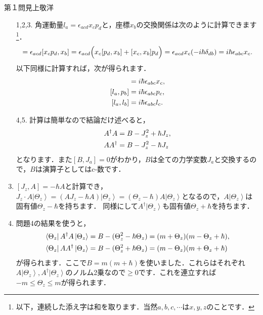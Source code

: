 \newcommand{\bra}[1]{\left\langle {#1} \right|}
\newcommand{\ket}[1]{\left| {#1} \right\rangle}
\begin{answer}{第１問}{見上敬洋}
\begin{enumerate}
\item[1,2,3.]
  角運動量$l_a = \epsilon_{acd}x_c p_d$と，座標$x_b$の交換関係は次のように計算できます
  \footnote{以下，連続した添え字は和を取ります．当然$a,b,c,\cdots$は$x,y,z$のことです．}． 
  \begin{equation}
  [l_a,x_b] = \epsilon_{acd}[x_c p_d, x_b]
  = \epsilon_{acd}\Big( x_c[p_d,x_b] + [x_c,x_b]p_d \Big)
  = \epsilon_{acd} x_c (-i\hbar \delta_{db}) 
  = i\hbar \epsilon_{abc} x_c . \notag
  \end{equation}
  以下同様に計算すれば，次が得られます．
  \begin{align}
  [l_a,x_b] &= i\hbar \epsilon_{abc} x_c ,\notag\\
  [l_a,p_b] &= i\hbar \epsilon_{abc} p_c ,\notag\\
  [l_a,l_b] &= i\hbar \epsilon_{abc} l_c . \notag
  \end{align}

\setcounter{enumi}{3}
\item[4,5.]
  計算は簡単なので結論だけ述べると，
  \begin{align}
  A^\dagger A &= B - J_z^2 + \hbar J_z, \notag\\
  AA^\dagger  &= B - J_z^2 - \hbar J_z \notag
  \end{align}
  となります．また$[B,J_a] = 0$がわかり，$B$は全ての力学変数$J_a$と交換するので，$B$は演算子としてはc-数です．

\setcounter{enumi}{5}
\item{}
  $[J_z, A] = -\hbar A$と計算でき，$J_z\cdot A \ket{\Theta_z} = (AJ_z -\hbar A)\ket{\Theta_z} = (\Theta_z-\hbar) A\ket{\Theta_z}$となるので，$A\ket{\Theta_z}$は固有値$\Theta_z-\hbar$を持ちます．
  同様にして$A^\dagger\ket{\Theta_z} $も固有値$\Theta_z + \hbar$を持ちます．

\item{}
  問題4の結果を使うと，
  \begin{align}
  \bra{\Theta_z} A^\dagger A \ket{\Theta_z} &= B - (\Theta_z ^2 - \hbar \Theta_z) = (m+\Theta_z)(m-\Theta_z+\hbar) \notag, \\
  \bra{\Theta_z} AA^\dagger  \ket{\Theta_z} &= B - (\Theta_z ^2 + \hbar \Theta_z) = (m-\Theta_z)(m+\Theta_z+\hbar) \notag
  \end{align}
  が得られます．ここで$B=m(m+\hbar)$を使いました．これらはそれぞれ$A\ket{\Theta_z},A^\dagger \ket{\Theta_z}$のノルム2乗なので$\geq 0$です．これを連立すれば$-m\leq \Theta_z \leq m$が得られます．


\end{enumerate}
\end{answer}
